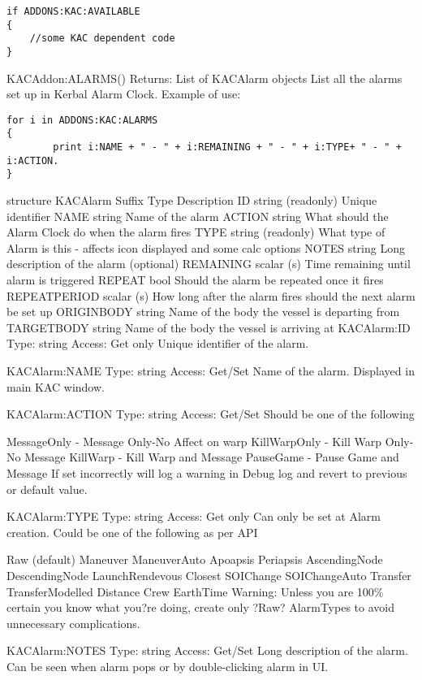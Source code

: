 \begin{Verbatim}[frame=single]
if ADDONS:KAC:AVAILABLE
{
    //some KAC dependent code
}
\end{Verbatim}

KACAddon:ALARMS()
Returns:	List of KACAlarm objects
List all the alarms set up in Kerbal Alarm Clock. Example of use:

\begin{Verbatim}[frame=single]
for i in ADDONS:KAC:ALARMS
{
        print i:NAME + " - " + i:REMAINING + " - " + i:TYPE+ " - " + i:ACTION.
}
\end{Verbatim}

structure KACAlarm
Suffix	Type	Description
ID	string (readonly)	Unique identifier
NAME	string	Name of the alarm
ACTION	string	What should the Alarm Clock do when the alarm fires
TYPE	string (readonly)	What type of Alarm is this - affects icon displayed and some calc options
NOTES	string	Long description of the alarm (optional)
REMAINING	scalar (s)	Time remaining until alarm is triggered
REPEAT	bool	Should the alarm be repeated once it fires
REPEATPERIOD	scalar (s)	How long after the alarm fires should the next alarm be set up
ORIGINBODY	string	Name of the body the vessel is departing from
TARGETBODY	string	Name of the body the vessel is arriving at
KACAlarm:ID
Type:	string
Access:	Get only
Unique identifier of the alarm.

KACAlarm:NAME
Type:	string
Access:	Get/Set
Name of the alarm. Displayed in main KAC window.

KACAlarm:ACTION
Type:	string
Access:	Get/Set
Should be one of the following

MessageOnly - Message Only-No Affect on warp
KillWarpOnly - Kill Warp Only-No Message
KillWarp - Kill Warp and Message
PauseGame - Pause Game and Message
If set incorrectly will log a warning in Debug log and revert to previous or default value.

KACAlarm:TYPE
Type:	string
Access:	Get only
Can only be set at Alarm creation. Could be one of the following as per API

Raw (default)
Maneuver
ManeuverAuto
Apoapsis
Periapsis
AscendingNode
DescendingNode
LaunchRendevous
Closest
SOIChange
SOIChangeAuto
Transfer
TransferModelled
Distance
Crew
EarthTime
Warning: Unless you are 100\% certain you know what you?re doing, create only ?Raw? AlarmTypes to avoid unnecessary complications.

KACAlarm:NOTES
Type:	string
Access:	Get/Set
Long description of the alarm. Can be seen when alarm pops or by double-clicking alarm in UI.

